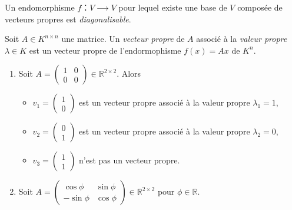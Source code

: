 \begin{definition}
  \label{def:39}
  Un endomorphisme $f ：V ⟶ V$ pour lequel existe une base de $V$ composée de vecteurs propres est \emph{diagonalisable}. 
\end{definition}


\begin{definition}
  \label{def:40}
  Soit $A ∈ K^{n ×n}$ une matrice.
  Un \emph{vecteur propre} de $A$ associé à la \emph{valeur propre} $λ ∈K$ est un vecteur propre de l'endormophisme  $f(x) = Ax$ de $K^n$.
\end{definition}




\begin{example}
 \begin{enumerate}
 \item Soit $A = \left(\begin{array}{cc}
1 & 0 \\
0 & 0
\end{array}
\right) \in ℝ^{2 ×2}$. Alors
\begin{itemize}
 \item $v_1 = \left( \begin{array}{c} 1 \\ 0 \end{array} \right)$ est un vecteur propre associ\'e \`a la valeur propre $\lambda_1 = 1$,
 \item $v_2 = \left( \begin{array}{c} 0 \\ 1 \end{array} \right)$ est un vecteur propre associ\'e \`a la valeur propre $\lambda_2 = 0$,
 \item $v_3 = \left( \begin{array}{c} 1 \\ 1 \end{array} \right)$ n'est pas un vecteur propre.
\end{itemize}
\item Soit $A = \left(\begin{array}{cc}
\cos \phi & \sin \phi \\
-\sin\phi & \cos \phi
\end{array}
\right) \in ℝ^{2 ×2}$ pour $\phi \in ℝ$. 
\end{enumerate}
\end{example}

